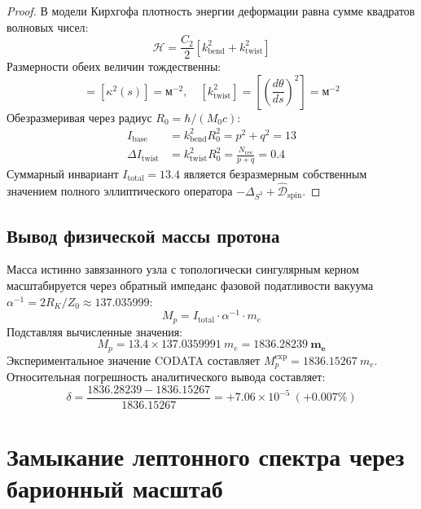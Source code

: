 \documentclass[12pt,a4paper]{article}
\begin{document}
\begin{proof}
	В модели Кирхгофа плотность энергии деформации равна сумме квадратов волновых чисел:
	\begin{equation}
		\mathcal{H} = \frac{C_2}{2} \left[ k_{\text{bend}}^2 + k_{\text{twist}}^2 \right]
	\end{equation}
	Размерности обеих величин тождественны:
	\begin{equation}
		[k_{\text{bend}}^2] = [\kappa^2(s)] = \text{м}^{-2}, \quad [k_{\text{twist}}^2] = \left[\left(\frac{d\theta}{ds}\right)^2\right] = \text{м}^{-2}
	\end{equation}
	Обезразмеривая через радиус $R_0 = \hbar / (M_0 c)$:
	\begin{align}
		I_{\text{base}} &= k_{\text{bend}}^2 R_0^2 = p^2 + q^2 = 13 \\
		\Delta I_{\text{twist}} &= k_{\text{twist}}^2 R_0^2 = \frac{N_{\text{rev}}}{p+q} = 0.4
	\end{align}
	Суммарный инвариант $I_{\text{total}} = 13.4$ является безразмерным собственным значением полного эллиптического оператора $-\Delta_{S^3} + \hat{\mathcal{D}}_{\text{spin}}$.
\end{proof}

\subsection{Вывод физической массы протона}
Масса истинно завязанного узла с топологически сингулярным керном масштабируется через обратный импеданс фазовой податливости вакуума $\alpha^{-1} = 2R_K / Z_0 \approx 137.035999$:
\begin{equation}
	M_p = I_{\text{total}} \cdot \alpha^{-1} \cdot m_e
\end{equation}
Подставляя вычисленные значения:
\begin{equation}
	M_p = 13.4 \times 137.0359991 \ m_e = \mathbf{1836.28239 \ m_e}
\end{equation}
Экспериментальное значение CODATA составляет $M_p^{\text{exp}} = 1836.15267 \ m_e$. 
Относительная погрешность аналитического вывода составляет:
\begin{equation}
	\delta = \frac{1836.28239 - 1836.15267}{1836.15267} = +7.06 \times 10^{-5} \ (+0.007\%)
\end{equation}

\section{Замыкание лептонного спектра через барионный масштаб}
\end{document}
